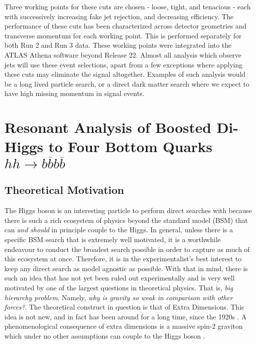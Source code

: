 \documentclass[12pt]{article}
\begin{document}
Three working points for these cuts are chosen - loose, tight, and tenacious -
each with successively increasing fake jet rejection, and decreasing efficiency.
The performance of these cuts has been characterized across detector geometries
and transverse momentum for each working point. This is performed separately for
both Run 2 and Run 3 data. These working points were integrated into the ATLAS
Athena software \cite{atlas_simulation} beyond Release 22. Almost all analysis
which observe jets will use these event selections, apart from a few exceptions
where applying these cuts may eliminate the signal altogether. Examples of such
analysis would be a long lived particle search, or a direct dark matter search
where we expect to have high missing momentum in signal events.


\section{Resonant Analysis of Boosted Di-Higgs to Four Bottom Quarks
$hh\rightarrow b\overline{b}b\overline{b}$}
\subsection{Theoretical Motivation}

The Higgs boson is an interesting particle to perform direct searches with
because there is such a rich ecosystem of physics beyond the standard model
(BSM) that can \textit{and should} in principle couple to the Higgs. In general,
unless there is a specific BSM search that is extremely well motivated, it is a
worthwhile endeavour to conduct the broadest search possible in order to capture
as much of this ecosystem at once. Therefore, it is in the experimentalist's
best interest to keep any direct search as model agnostic as possible. With that
in mind, there is such an idea that has not yet been ruled out experimentally
and is very well motivated by one of the largest questions in theoretical
physics. That is, \textit{big hierarchy problem}. Namely, \textit{why is gravity
so weak in comparison with other forces?}. The theoretical construct in question
is that of Extra Dimensions. This idea is not new, and in fact has been around
for a long time, since the 1920s \cite{KALUZA_2018}. A phenomenological
consequence of extra dimensions is a massive spin-2 graviton which under no
other assumptions can couple to the Higgs boson \cite{bsm}.  
\end{document}
